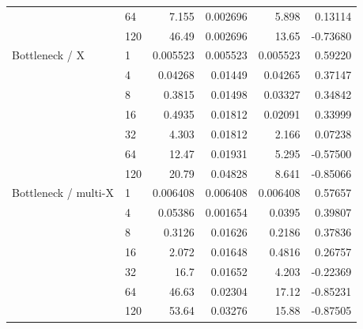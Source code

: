 \begin{longtable}{llrrrr}
 & 64 & 7.155 & 0.002696 & 5.898 & 0.13114 \\
 & 120 & 46.49 & 0.002696 & 13.65 & -0.73680 \\
\midrule
Bottleneck / X & 1 & 0.005523 & 0.005523 & 0.005523 & 0.59220 \\
 & 4 & 0.04268 & 0.01449 & 0.04265 & 0.37147 \\
 & 8 & 0.3815 & 0.01498 & 0.03327 & 0.34842 \\
 & 16 & 0.4935 & 0.01812 & 0.02091 & 0.33999 \\
 & 32 & 4.303 & 0.01812 & 2.166 & 0.07238 \\
 & 64 & 12.47 & 0.01931 & 5.295 & -0.57500 \\
 & 120 & 20.79 & 0.04828 & 8.641 & -0.85066 \\
\midrule
Bottleneck / multi-X & 1 & 0.006408 & 0.006408 & 0.006408 & 0.57657 \\
 & 4 & 0.05386 & 0.001654 & 0.0395 & 0.39807 \\
 & 8 & 0.3126 & 0.01626 & 0.2186 & 0.37836 \\
 & 16 & 2.072 & 0.01648 & 0.4816 & 0.26757 \\
 & 32 & 16.7 & 0.01652 & 4.203 & -0.22369 \\
 & 64 & 46.63 & 0.02304 & 17.12 & -0.85231 \\
 & 120 & 53.64 & 0.03276 & 15.88 & -0.87505 \\
\midrule
\bottomrule
\end{longtable}
